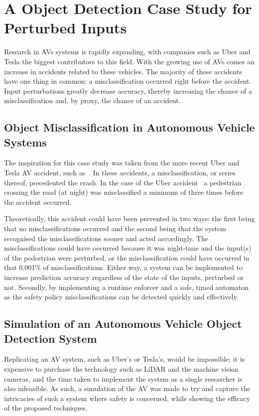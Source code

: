 \section{A Object Detection Case Study for Perturbed Inputs}
Research in \acfp{AV} systems is rapidly expanding, with companies such as Uber and Tesla the biggest contributors to this field.
With the growing use of \acp{AV} comes an increase in accidents related to these vehicles.
The majority of these accidents have one thing in common: a misclassification occurred right before the accident.
Input perturbations greatly decrease accuracy, thereby increasing the chance of a misclassification and, by proxy, the chance of an accident.


\subsection{Object Misclassification in Autonomous Vehicle Systems}
The inspiration for this case study was taken from the more recent Uber and Tesla \ac{AV} accident, such as~\cite{coldewey_2018}.
In these accidents, a misclassification, or series thereof, precedented the crash.
In the case of the Uber accident~\cite{coldewey_2018} a pedestrian crossing the road (at night) was misclassified a minimum of three times before the accident occurred.

Theoretically, this accident could have been prevented in two ways: the first being that no misclassifications occurred and the second being that the system recognised the misclassifications sooner and acted accordingly.
The misclassifications could have occurred because it was night-time and the input(s) of the pedestrian were perturbed, or the misclassification could have occurred in that 0.001\% of misclassifications. 
Either way, a system can be implemented to increase prediction accuracy regardless of the state of the inputs, perturbed or not.
Secondly, by implementing a runtime enforcer and a safe, timed automaton as the safety policy misclassifications can be detected quickly and effectively.


\subsection{Simulation of an Autonomous Vehicle Object Detection System}
Replicating an \ac{AV} system, such as Uber's or Tesla's, would be impossible; it is expensive to purchase the technology such as \ac{LiDAR} and the machine vision cameras, and the time taken to implement the system as a single researcher is also infeasible.
As such, a simulation of the \ac{AV} was made to try and capture the intricacies of such a system where safety is concerned, while showing the efficacy of the proposed techniques.


